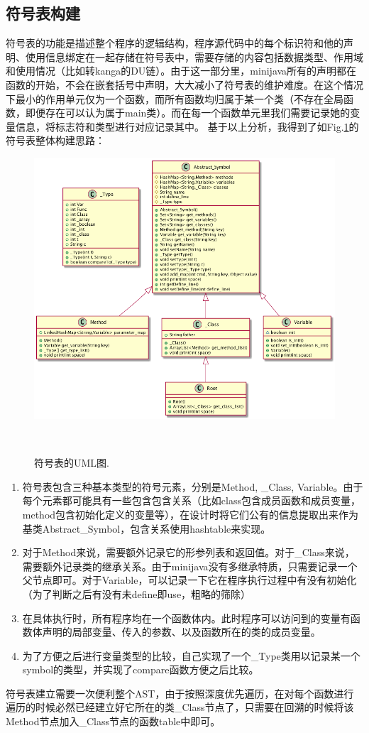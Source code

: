 \documentclass[10pt,a4paper]{article}
\begin{document}
\subsection{符号表构建}
符号表的功能是描述整个程序的逻辑结构，程序源代码中的每个标识符和他的声明、使用信息绑定在一起存储在符号表中，需要存储的内容包括数据类型、作用域和使用情况（比如转kanga的DU链）。由于这一部分里，minijava所有的声明都在函数的开始，不会在嵌套括号中声明，大大减小了符号表的维护难度。在这个情况下最小的作用单元仅为一个函数，而所有函数均归属于某一个类（不存在全局函数，即便存在可以认为属于main类）。而在每一个函数单元里我们需要记录她的变量信息，将标志符和类型进行对应记录其中。
基于以上分析，我得到了如Fig.\ref{fig:umla}的符号表整体构建思路：
\begin{figure}[ht]
\centering
  \includegraphics[width=1\textwidth]{uml1.png}
  \caption{符号表的UML图.}~\label{fig:umla}
\end{figure}

\begin{enumerate}
      \item  符号表包含三种基本类型的符号元素，分别是Method, \_Class, Variable。由于每个元素都可能具有一些包含包含关系（比如class包含成员函数和成员变量，method包含初始化定义的变量等），在设计时将它们公有的信息提取出来作为基类Abstract\_Symbol，包含关系使用hashtable来实现。 
      \item  对于Method来说，需要额外记录它的形参列表和返回值。对于\_Class来说，需要额外记录类的继承关系。由于minijava没有多继承特质，只需要记录一个父节点即可。对于Variable，可以记录一下它在程序执行过程中有没有初始化（为了判断之后有没有未define即use，粗略的筛除）
      \item  在具体执行时，所有程序均在一个函数体内。此时程序可以访问到的变量有函数体声明的局部变量、传入的参数、以及函数所在的类的成员变量。
      \item  为了方便之后进行变量类型的比较，自己实现了一个\_Type类用以记录某一个symbol的类型，并实现了compare函数方便之后比较。
\end{enumerate}
符号表建立需要一次便利整个AST，由于按照深度优先遍历，在对每个函数进行遍历的时候必然已经建立好它所在的类\_Class节点了，只需要在回溯的时候将该Method节点加入\_Class节点的函数table中即可。
\end{document}
